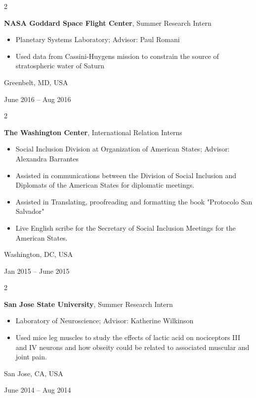 \documentclass[10pt, letterpaper]{article}
\newenvironment{highlights}{
    \begin{itemize}[
        topsep=0.10 cm,
        parsep=0.10 cm,
        partopsep=0pt,
        itemsep=0pt,
        leftmargin=0.4 cm + 10pt
    ]
}{
    \end{itemize}
} %
\newenvironment{twocolentry}[2][]{
    \onecolentry
    \def\secondColumn{#2}
    \setcolumnwidth{\fill, 4.5 cm}
    \begin{paracol}{2}
}{
    \switchcolumn \raggedleft \secondColumn
    \end{paracol}
    \endonecolentry
} %
\begin{document}
        \vspace{0.2 cm}

        \begin{twocolentry}{
            Greenbelt, MD, USA

        June 2016 – Aug 2016
        }
            \textbf{NASA Goddard Space Flight Center}, Summer Research Intern
            \begin{highlights}
                \item Planetary Systems Laboratory; Advisor: Paul Romani
                \item Used data from Cassini-Huygens mission to constrain the source of stratospheric water of Saturn
            \end{highlights}
        \end{twocolentry}


        \vspace{0.2 cm}

        \begin{twocolentry}{
            Washington, DC, USA

        Jan 2015 – June 2015
        }
            \textbf{The Washington Center}, International Relation Interns
            \begin{highlights}
                \item Social Inclusion Division at Organization of American States; Advisor: Alexandra Barrantes
                \item Assisted in communications between the Division of Social Inclusion and Diplomats of the American States for diplomatic meetings.
                \item Assisted in Translating, proofreading and formatting the book "Protocolo San Salvador"
                \item Live English scribe for the Secretary of Social Inclusion Meetings for the American States.
            \end{highlights}
        \end{twocolentry}


        \vspace{0.2 cm}

        \begin{twocolentry}{
            San Jose, CA, USA

        June 2014 – Aug 2014
        }
            \textbf{San Jose State University}, Summer Research Intern
            \begin{highlights}
                \item Laboratory of Neuroscience; Advisor: Katherine Wilkinson
                \item Used mice leg muscles to study the effects of lactic acid on nociceptors III and IV neurons and how obseity could be related to associated muscular and joint pain.
            \end{highlights}
        \end{twocolentry}
\end{document}
